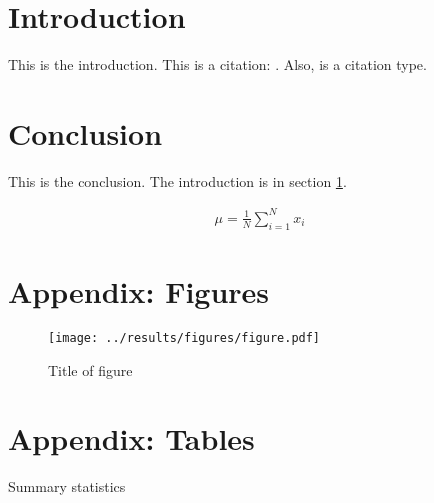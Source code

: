 \onehalfspacing
\newpage
\clearpage
\setcounter{page}{1}


\section{Introduction}
\label{sec:intro}

This is the introduction. This is a citation: \cite{Fehder2014}. Also, \citep{Fehder2014} is a citation type.



\section{Conclusion}
\label{sec:conclusion}

This is the conclusion. The introduction is in section \ref{sec:intro}.

\begin{align}
	\mu = \frac{1}{N} \sum_{i=1}^N x_i
\end{align}


\clearpage





\clearpage

\begin{appendix}
\section{Appendix: Figures}
\setcounter{table}{0}
\renewcommand{\thetable}{A-\arabic{table}}
\setcounter{figure}{0}
\renewcommand{\thefigure}{A-\arabic{figure}}


\begin{figure}[htb]
    \centering
    \caption{Title of figure}\label{fig:figure_name}
    \vspace{2mm}
    \texttt{[image: ../results/figures/figure.pdf]}
    \end{figure}



\clearpage
\section{Appendix: Tables}

\begin{table}[htb]
    \vspace{0.5cm}
    \caption{Summary statistics}
    \label{tab:sumstat}
    \renewcommand{\arraystretch}{1.3}
    \small
    \begin{center}
    
    \end{center}
    \end{table}


\end{appendix}




